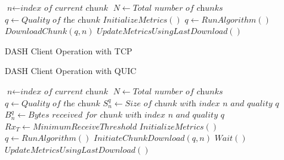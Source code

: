 \begin{algorithm}
\begin{algorithmic}[1]
\State $\textit{n} \gets \textit{index of current chunk}$
\State $N \gets \textit{Total number of chunks}$
\State $q \gets \textit{Quality of the chunk}$
\State ${InitializeMetrics()}$
\State ${q \gets RunAlgorithm()}$
\State ${DownloadChunk(q, n)}$
\State ${UpdateMetricsUsingLastDownload()}$
\EndWhile
\EndProcedure
\end{algorithmic}
\caption{DASH Client Operation with TCP}\label{euclid}
\end{algorithm}
 

\begin{algorithm}
\caption{DASH Client Operation with QUIC}\label{euclid}
\begin{algorithmic}[1]
\State $\textit{n} \gets \textit{index of current chunk}$
\State $N \gets \textit{Total number of chunks}$
\State $q \gets \textit{Quality of the chunk}$
\State $S_n^q \gets \textit{Size of chunk with index n and quality q}$
\State $B_n^q  \gets \textit{Bytes received for chunk with index n and quality q }$
\State $Rx_T \gets Minimum Receive Threshold$
\State ${InitializeMetrics()}$
\State ${q \gets RunAlgorithm()}$
\State $InitiateChunkDownload(q, n)$
\State $Wait()$
\EndWhile
\State ${UpdateMetricsUsingLastDownload()}$
\EndWhile
\EndProcedure
\end{algorithmic}
\end{algorithm}



%
%
